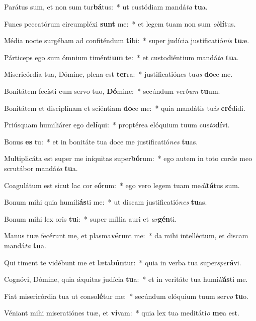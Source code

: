 \item Parátus sum, et non sum tur\textbf{bá}tus:~* ut custódiam mandá\textit{ta} \textbf{tu}a.
\item Funes peccatórum circumpléxi \textbf{sunt} me:~* et legem tuam non sum \textit{ob}\textbf{lí}tus.
\item Média nocte surgébam ad confiténdum \textbf{ti}bi:~* super judícia justificatió\textit{nis} \textbf{tu}æ.
\item Párticeps ego sum ómnium timénti\textbf{um} te:~* et custodiéntium mandá\textit{ta} \textbf{tu}a.
\item Misericórdia tua, Dómine, plena est \textbf{ter}ra:~* justificatiónes tu\textit{as} \textbf{do}ce me.
\item Bonitátem fecísti cum servo tuo, \textbf{Dó}mine:~* secúndum ver\textit{bum} \textbf{tu}um.
\item Bonitátem et disciplínam et sciéntiam \textbf{do}ce me:~* quia mandátis tu\textit{is} \textbf{cré}didi.
\item Priúsquam humiliárer ego de\textbf{lí}qui:~* proptérea elóquium tuum cus\textit{to}\textbf{dí}vi.
\item Bonus \textbf{es} tu:~* et in bonitáte tua doce me justificatió\textit{nes} \textbf{tu}as.
\item Multiplicáta est super me iníquitas super\textbf{bó}rum:~* ego autem in toto corde meo scrutábor mandá\textit{ta} \textbf{tu}a.
\item Coagulátum est sicut lac cor e\textbf{ó}rum:~* ego vero legem tuam me\textit{di}\textbf{tá}tus sum.
\item Bonum mihi quia humili\textbf{ás}ti me:~* ut discam justificatió\textit{nes} \textbf{tu}as.
\item Bonum mihi lex oris \textbf{tu}i:~* super míllia auri et \textit{ar}\textbf{gén}ti.
\item Manus tuæ fecérunt me, et plasma\textbf{vé}runt me:~* da mihi intelléctum, et discam mandá\textit{ta} \textbf{tu}a.
\item Qui timent te vidébunt me et læta\textbf{bún}tur:~* quia in verba tua super\textit{spe}\textbf{rá}vi.
\item Cognóvi, Dómine, quia ǽquitas judícia \textbf{tu}a:~* et in veritáte tua humi\textit{li}\textbf{ás}ti me.
\item Fiat misericórdia tua ut conso\textbf{lé}tur me:~* secúndum elóquium tuum ser\textit{vo} \textbf{tu}o.
\item Véniant mihi miseratiónes tuæ, et \textbf{vi}vam:~* quia lex tua meditáti\textit{o} \textbf{me}a est.
